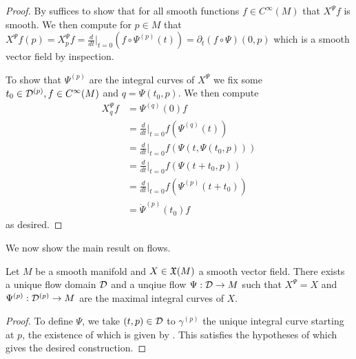 \begin{proof}
    By  suffices to show that for all smooth functions $f\in C^{\infty}(M)$ that $X^{\Psi}f$ is smooth. We then compute for $p\in M$ that $X^{\Psi}f(p)=X^{\Psi}_{p}f=\frac{d}{dt}|_{t=0}(f\circ\Psi^{(p)}(t))=\partial_{t}(f\circ\Psi)(0,p)$ which is a smooth vector field by inspection. 

    To show that $\Psi^{(p)}$ are the integral curves of $X^{\Psi}$ we fix some $t_{0}\in\mathcal{D}^{(p)}, f\in C^{\infty}(M)$ and $q=\Psi(t_{0},p)$. We then compute 
    \begin{align*}
        X^{\Psi}_{q}f &= \Psi^{(q)}(0)f \\
        &= \frac{d}{dt}|_{t=0}f(\Psi^{(q)}(t)) \\
        &= \frac{d}{dt}|_{t=0}f(\Psi(t,\Psi(t_{0},p))) \\
        &= \frac{d}{dt}|_{t=0}f(\Psi(t+t_{0},p)) \\
        &= \frac{d}{dt}|_{t=0}f(\Psi^{(p)}(t+t_{0})) \\
        &= \dot{\Psi}^{(p)}(t_{0})f
    \end{align*}
    as desired. 
\end{proof}
We now show the main result on flows. 
\begin{theorem}[Flow]\label{thm: flow}
    Let $M$ be a smooth manifold and $X\in\mathfrak{X}(M)$ a smooth vector field. There exists a unique flow domain $\mathcal{D}$ and a unqiue flow $\Psi:\mathcal{D}\to M$ such that $X^{\Psi}=X$ and $\Psi^{(p)}:\mathcal{D}^{(p)}\to M$ are the maximal integral curves of $X$. 
\end{theorem}
\begin{proof}
    To define $\Psi$, we take $(t,p)\in\mathcal{D}$ to $\gamma^{(p)}$ the unique integral curve starting at $p$, the existence of which is given by . This satisfies the hypotheses of  which gives the desired construction. 
\end{proof}

